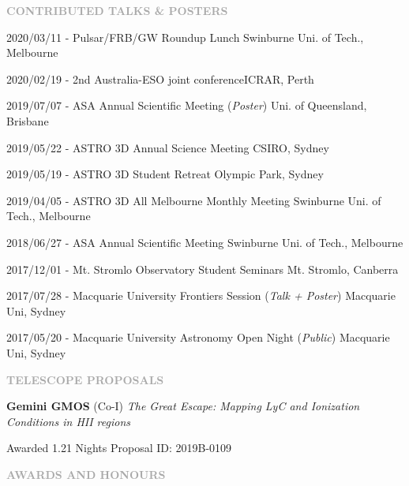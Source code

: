 \documentclass[11pt]{extarticle}
\def\Vhrulefill{{\color{BurntOrange}{\leavevmode\leaders\hrule height 1.2ex depth \dimexpr0.5pt-0.9ex\hfill\kern5pt}}}
\begin{document}
\vspace{3ex}
\noindent
\textcolor{darkgray}{\Large\normalfont\bfseries\MakeUppercase{Contributed Talks \& Posters}} \Vhrulefill
\vspace{2ex}

2020/03/11 - Pulsar/FRB/GW Roundup Lunch \hfill Swinburne Uni. of Tech., Melbourne \par
2020/02/19 - 2nd Australia-ESO joint conference\hfill ICRAR, Perth\par 
2019/07/07 - ASA Annual Scientific Meeting (\emph{Poster}) \hfill Uni. of Queensland, Brisbane \par
2019/05/22 - ASTRO 3D Annual Science Meeting \hfill CSIRO, Sydney \par
2019/05/19 - ASTRO 3D Student Retreat \hfill Olympic Park, Sydney \par 
2019/04/05 - ASTRO 3D All Melbourne Monthly Meeting \hfill Swinburne Uni. of Tech., Melbourne \par
2018/06/27 - ASA Annual Scientific Meeting \hfill Swinburne Uni. of Tech., Melbourne\par
2017/12/01 - Mt. Stromlo Observatory Student Seminars \hfill Mt. Stromlo, Canberra \par
2017/07/28 - Macquarie University Frontiers Session (\emph{Talk + Poster}) \hfill Macquarie Uni, Sydney \par
2017/05/20 - Macquarie University Astronomy Open Night (\emph{Public}) \hfill Macquarie Uni, Sydney \par

\clearpage

\vspace{3ex}
\noindent
\textcolor{darkgray}{\Large\normalfont\bfseries\MakeUppercase{Telescope Proposals}} \Vhrulefill
\vspace{2ex}

\textbf{Gemini GMOS} (Co-I) \emph{The Great Escape: Mapping LyC and Ionization Conditions in HII regions} \par Awarded 1.21 Nights  Proposal ID: 2019B-0109 

\vspace{3ex}
\noindent
\textcolor{darkgray}{\Large\normalfont\bfseries\MakeUppercase{Awards and Honours}} \Vhrulefill
\vspace{2ex}
\end{document}
